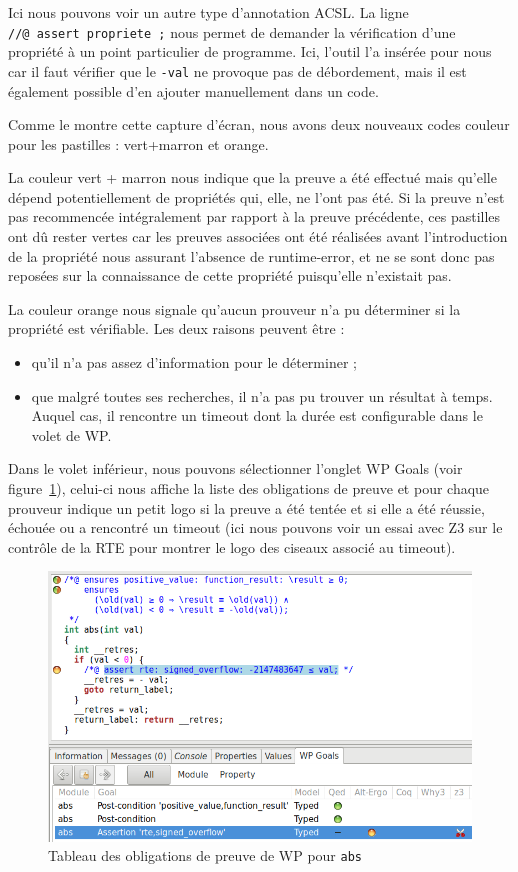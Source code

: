\documentclass[12pt,francais,]{scrbook}
\providecommand{\tightlist}{%
  \setlength{\itemsep}{0pt}\setlength{\parskip}{0pt}}
\begin{document}
Ici nous pouvons voir un autre type d'annotation ACSL. La ligne
\texttt{//@\ assert\ propriete\ ;} nous permet de demander la
vérification d'une propriété à un point particulier de programme. Ici,
l'outil l'a insérée pour nous car il faut vérifier que le \texttt{-val}
ne provoque pas de débordement, mais il est également possible d'en
ajouter manuellement dans un code.

Comme le montre cette capture d'écran, nous avons deux nouveaux codes
couleur pour les pastilles : vert+marron et orange.

La couleur vert + marron nous indique que la preuve a été effectué mais
qu'elle dépend potentiellement de propriétés qui, elle, ne l'ont pas
été. Si la preuve n'est pas recommencée intégralement par rapport à la
preuve précédente, ces pastilles ont dû rester vertes car les preuves
associées ont été réalisées avant l'introduction de la propriété nous
assurant l'absence de runtime-error, et ne se sont donc pas reposées sur
la connaissance de cette propriété puisqu'elle n'existait pas.

La couleur orange nous signale qu'aucun prouveur n'a pu déterminer si la
propriété est vérifiable. Les deux raisons peuvent être :

\begin{itemize}
\tightlist
\item
  qu'il n'a pas assez d'information pour le déterminer ;
\item
  que malgré toutes ses recherches, il n'a pas pu trouver un résultat à
  temps. Auquel cas, il rencontre un timeout dont la durée est
  configurable dans le volet de WP.
\end{itemize}

Dans le volet inférieur, nous pouvons sélectionner l'onglet \og{}WP
Goals\fg{} (voir figure~\ref{fig:2-1-1-abs-5}),
celui-ci nous affiche la liste des obligations de preuve et
pour chaque prouveur indique un petit logo si la preuve a été tentée et
si elle a été réussie, échouée ou a rencontré un timeout (ici nous
pouvons voir un essai avec Z3 sur le contrôle de la RTE pour montrer le
logo des ciseaux associé au timeout).

\begin{figure}[htbp]
\centering
\includegraphics[scale=0.5]{2-1-1-abs-5.png}
\caption{Tableau des obligations de preuve de WP pour \texttt{abs}}
\label{fig:2-1-1-abs-5}
\end{figure}
\end{document}

